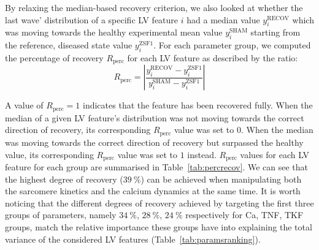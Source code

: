 \vspace{0.2cm}
By relaxing the median-based recovery criterion, we also looked at whether the last wave' distribution of a specific LV feature $i$ had a median value $y_{i}^{\textrm{RECOV}}$ which was moving towards the healthy experimental mean value $y_{i}^{\textrm{SHAM}}$ starting from the reference, diseased state value $y_{i}^{\textrm{ZSF1}}$. For each parameter group, we computed the percentage of recovery $R_{\textrm{perc}}$ for each LV feature as described by the ratio:
%
\begin{equation}
    R_{\textrm{perc}} = \left|\frac{y_{i}^{\textrm{RECOV}}-y_{i}^{\textrm{ZSF1}}}{y_{i}^{\textrm{SHAM}}-y_{i}^{\textrm{ZSF1}}}\right|
\end{equation}

\vspace{0.2cm}\noindent
A value of $R_{\textrm{perc}}=1$ indicates that the feature has been recovered fully. When the median of a given LV feature's distribution was not moving towards the correct direction of recovery, its corresponding $R_{\textrm{perc}}$ value was set to $0$. When the median was moving towards the correct direction of recovery but surpassed the healthy value, its corresponding $R_{\textrm{perc}}$ value was set to $1$ instead. $R_{\textrm{perc}}$ values for each LV feature for each group are summarised in Table~\ref{tab:percrecov}. We can see that the highest degree of recovery ($\SI{39}{\percent}$) can be achieved when manipulating both the sarcomere kinetics and the calcium dynamics at the same time. It is worth noticing that the different degrees of recovery achieved by targeting the first three groups of parameters, namely $\SI{34}{\percent}$, $\SI{28}{\percent}$, $\SI{24}{\percent}$ respectively for Ca, TNF, TKF groups, match the relative importance these groups have into explaining the total variance of the considered LV features (Table~\ref{tab:paramsranking}).

